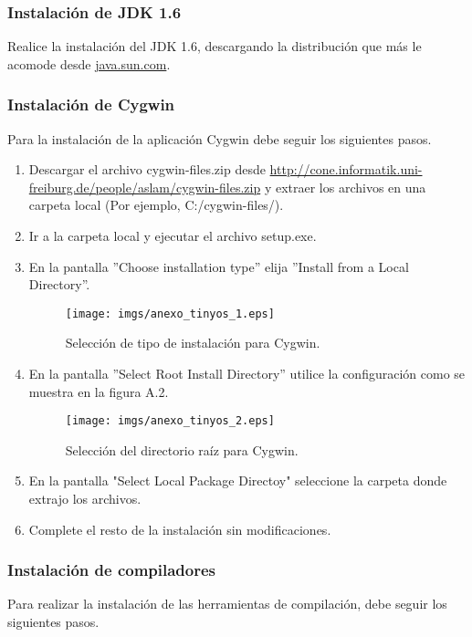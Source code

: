 \subsubsection{Instalación de JDK 1.6}
Realice la instalación del JDK 1.6, descargando la distribución que más le acomode desde \url{java.sun.com}.

\subsubsection{Instalación de Cygwin}
Para la instalación de la aplicación Cygwin debe seguir los siguientes pasos.

\begin{enumerate}
\item Descargar el archivo cygwin-files.zip desde \url{http://cone.informatik.uni-freiburg.de/people/aslam/cygwin-files.zip} y extraer los archivos en una carpeta local (Por ejemplo, C:/cygwin-files/).
\item Ir a la carpeta local y ejecutar el archivo setup.exe.
\item En la pantalla ''Choose installation type'' elija ''Install from a Local Directory''.

\begin{center}
\begin{figure}[H]
\centering
\texttt{[image: imgs/anexo\_tinyos\_1.eps]} 
\caption{Selección de tipo de instalación para Cygwin.}
\end{figure}
\end{center}

\item En la pantalla ''Select Root Install Directory'' utilice la configuración como se muestra en la figura A.2.

\begin{center}
\begin{figure}[H]
\centering
\texttt{[image: imgs/anexo\_tinyos\_2.eps]} 
\caption{Selección del directorio raíz para Cygwin.}
\end{figure}
\end{center}

\item En la pantalla "Select Local Package Directoy" seleccione la carpeta donde extrajo los archivos.
\item Complete el resto de la instalación sin modificaciones.
\end{enumerate}

\subsubsection{Instalación de compiladores}
Para realizar la instalación de las herramientas de compilación, debe seguir los siguientes pasos.

